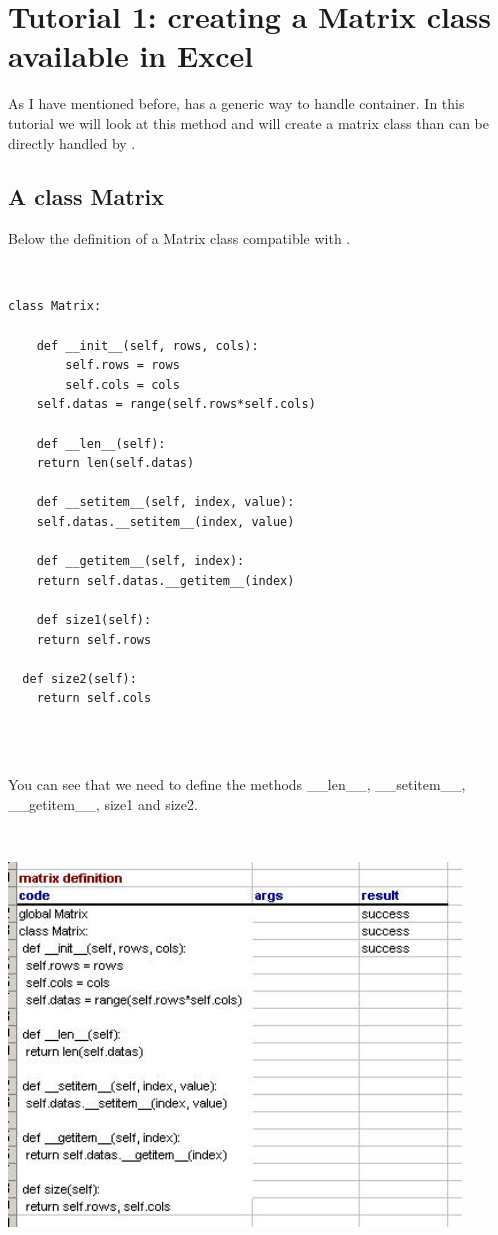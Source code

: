 \chapter{Tutorial 1: creating a Matrix class available in Excel}


As I have mentioned before, \xlp has a generic way to handle container. In this tutorial we will look at this method and will create a matrix class than can be directly handled by \xlp. 


\section{A class Matrix}


Below the definition of a Matrix class compatible with \xlp.

\

\begin{verbatim}
class Matrix:
 
	def __init__(self, rows, cols):
 		self.rows = rows
 		self.cols = cols
  	self.datas = range(self.rows*self.cols)

 	def __len__(self): 
  	return len(self.datas)

 	def __setitem__(self, index, value):
  	self.datas.__setitem__(index, value)

 	def __getitem__(self, index):
  	return self.datas.__getitem__(index)
 
 	def size1(self):
  	return self.rows
  	
  def size2(self):
  	return self.cols
  	
\end{verbatim}

\

You can see that we need to define the methods \_\_len\_\_, \_\_setitem\_\_,  \_\_getitem\_\_, size1 and size2.

\

\includegraphics[width=12cm]{images/matrix1.jpg}


